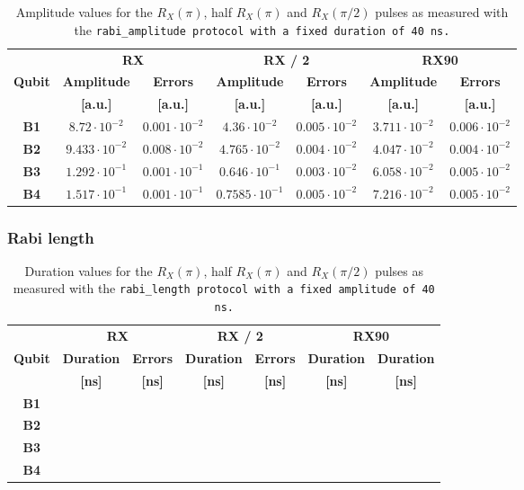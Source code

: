 \begin{table}[h!]
    \centering
    \begin{tabular}{c|cc|cc|cc}
        \toprule
         & \multicolumn{2}{c|}{\textbf{RX}} & \multicolumn{2}{c|}{\textbf{RX / 2}} & \multicolumn{2}{c|}{\textbf{RX90}} \\
        \textbf{Qubit} & \textbf{Amplitude} & \textbf{Errors} & \textbf{Amplitude} & \textbf{Errors} & \textbf{Amplitude} & \textbf{Errors} \\
         & \textbf{[a.u.]}  & \textbf{[a.u.]}  & \textbf{[a.u.]}  & \textbf{[a.u.]} & \textbf{[a.u.]} & \textbf{[a.u.]}\\
        \midrule
        \textbf{B1} & $8.72 \cdot 10^{-2}$ & $0.001 \cdot 10^{-2}$ & $4.36 \cdot 10^{-2}$ & $0.005 \cdot 10^{-2}$ & $3.711 \cdot 10^{-2}$ & $0.006 \cdot 10^{-2}$ \\
        \textbf{B2} & $9.433 \cdot 10^{-2}$ & $0.008 \cdot 10^{-2}$ & $4.765 \cdot 10^{-2}$ & $0.004 \cdot 10^{-2}$ & $4.047 \cdot 10^{-2}$ & $0.004 \cdot 10^{-2}$ \\
        \textbf{B3} & $1.292 \cdot 10^{-1}$ & $0.001 \cdot 10^{-1}$ & $0.646 \cdot 10^{-1}$ & $0.003 \cdot 10^{-2}$ & $6.058 \cdot 10^{-2}$ & $0.005 \cdot 10^{-2}$ \\
        \textbf{B4} & $1.517 \cdot 10^{-1}$ & $0.001 \cdot 10^{-1}$ & $0.7585 \cdot 10^{-1}$ & $0.005 \cdot 10^{-2}$ & $7.216 \cdot 10^{-2}$ & $0.005 \cdot 10^{-2}$ \\
        \bottomrule
    \end{tabular}
    \caption{Amplitude values for the $R_X(\pi)$, half $R_X(\pi)$ and $R_X(\pi/2)$ pulses as measured with the \tt{rabi\_amplitude} protocol with a fixed duration of 40 ns.}
\end{table}

\subsubsection{Rabi length}

\begin{table}[h!]
    \centering
    \begin{tabular}{c|cc|cc|cc}
        \toprule
         & \multicolumn{2}{c|}{\textbf{RX}} & \multicolumn{2}{c|}{\textbf{RX / 2}} & \multicolumn{2}{c|}{\textbf{RX90}} \\
        \textbf{Qubit} & \textbf{Duration} & \textbf{Errors} & \textbf{Duration} & \textbf{Errors} & \textbf{Duration} & \textbf{Duration} \\
         & \textbf{[ns]}  & \textbf{[ns]}  & \textbf{[ns]}  & \textbf{[ns]} & \textbf{[ns]} & \textbf{[ns]}\\
        \midrule
        \textbf{B1} & & & & & & \\
        \textbf{B2} & & & & & & \\
        \textbf{B3} & & & & & & \\
        \textbf{B4} & & & & & & \\
    \end{tabular}
    \caption{Duration values for the $R_X(\pi)$, half $R_X(\pi)$ and $R_X(\pi/2)$ pulses as measured with the \tt{rabi\_length} protocol with a fixed amplitude of 40 ns.}
\end{table}

